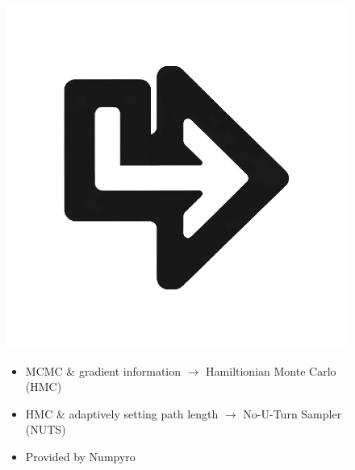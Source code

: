 \documentclass{beamer}
\begin{document}
\begin{frame}
\begin{figure}[htbp]
{\begin{minipage}[c][0.35\paperheight][c]{\linewidth}
			\begin{minipage}{0.1\linewidth}
				\includegraphics[angle=270, width=\linewidth]{images/left_turn_arrow.eps}
			\end{minipage}
			\hfill
			\begin{minipage}{0.58\linewidth}
				{\footnotesize \begin{itemize} 
					\item MCMC \& gradient information $\rightarrow$ Hamiltionian Monte Carlo (HMC)
					\item HMC \& adaptively setting path length $\rightarrow$ No-U-Turn Sampler (NUTS)
					\item Provided by Numpyro
			\end{itemize}}
			\end{minipage}
			\hfill
			\begin{minipage}{0.1\linewidth}

\end{minipage}
\end{minipage}}
\end{figure}
\end{frame}
\end{document}
